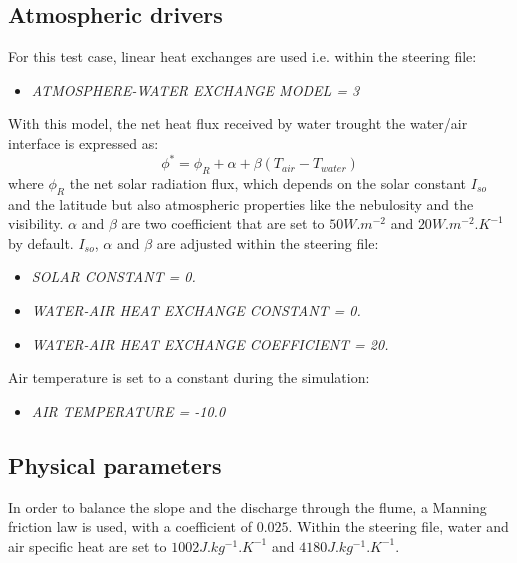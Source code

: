 \subsection{Atmospheric drivers}

For this test case, linear heat exchanges are used i.e. within the \waqtel steering file:
\begin{itemize}
	\item\textit{ATMOSPHERE-WATER EXCHANGE MODEL = 3}
\end{itemize}

With this model, the net heat flux received by water trought the water/air interface is expressed as:
\begin{equation}
\phi^* = \phi_R + \alpha + \beta (T_{air} - T_{water})
\end{equation}
where $\phi_R$ the net solar radiation flux, which depends on the solar constant $I_{so}$ and the latitude but 
also atmospheric properties like the nebulosity and the visibility. $\alpha$ and $\beta$ are two coefficient that 
are set to $50W.m^{-2}$ and $20W.m^{-2}.K^{-1}$ by default. $I_{so}$, $\alpha$ and $\beta$ are adjusted within 
the \khione steering file:
\begin{itemize}
	\item\textit{SOLAR CONSTANT = 0.}
	\item\textit{WATER-AIR HEAT EXCHANGE CONSTANT = 0.}
	\item\textit{WATER-AIR HEAT EXCHANGE COEFFICIENT = 20.}
\end{itemize}
Air temperature is set to a constant during the simulation:
\begin{itemize}
	\item\textit{AIR TEMPERATURE      = -10.0}
\end{itemize}  

\subsection{Physical parameters}

In order to balance the slope and the discharge through the flume, a Manning friction law is used, with a coefficient of $0.025$. Within the \waqtel steering file, water and air specific heat are set to $1002J.kg^{-1}.K^{-1}$ and $4180 J.kg^{-1}.K^{-1}$.

